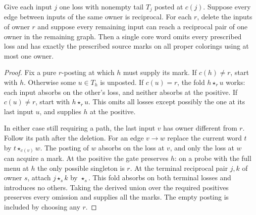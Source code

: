 \begin{lemma}
\label{core:lem:pure-posting-paths}
Give each input $j$ one loss with nonempty tail $T_j$ posted at
$c(j)$. Suppose every edge between inputs of the same owner is
reciprocal. For each $r$, delete the inputs of owner $r$ and
suppose every remaining input can reach a reciprocal pair of one
owner in the remaining graph. Then a single core word omits every
prescribed loss and has exactly the prescribed source marks on all
proper colorings using at most one owner.
\end{lemma}
\begin{proof}
Fix a pure $r$-posting at which $h$ must supply its mark. If $c(h)\ne r$,
start with $h$. Otherwise some $u\in T_h$ is unposted. If $c(u)=r$,
the fold $h\star_r u$ works: each input absorbs on the other's
loss, and neither absorbs at the positive. If $c(u)\ne r$, start
with $h\star_r u$. This omits all losses except possibly the one at
its last input $u$, and supplies $h$ at the positive.

In either case still requiring a path, the last input $v$ has owner
different from $r$. Follow its path after the deletion. For an edge
$v\to w$ replace the current word $t$ by $t\star_{c(v)}w$.
The posting of $w$ absorbs on the loss at $v$, and only the loss at
$w$ can acquire a mark. At the positive the gate preserves $h$:
on a probe with the full menu at $h$ the only possible singleton
is $r$. At the terminal reciprocal pair $j,k$ of owner $s$,
attach $j\star_s k$ by $\star_s$. This fold absorbs on both
terminal losses and introduces no others. Taking the derived union
over the required positives preserves every omission and supplies
all the marks. The empty posting is included by choosing any $r$.
\end{proof}

